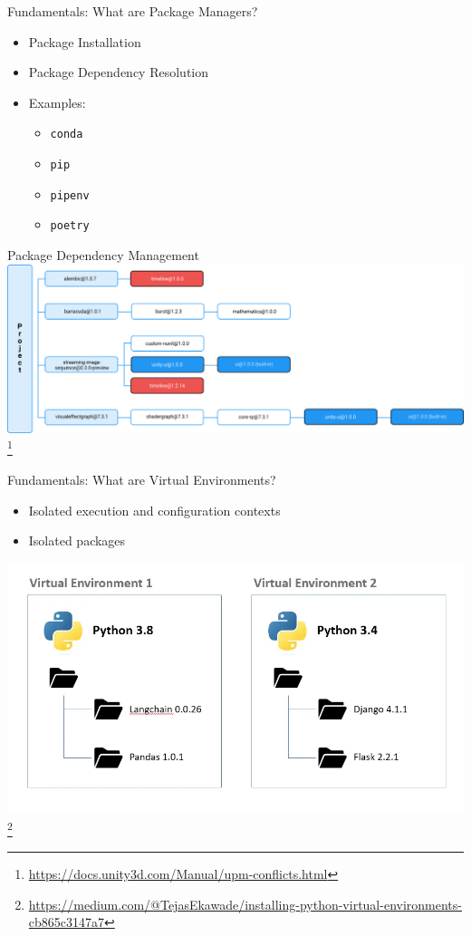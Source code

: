 \documentclass[aspectratio=169]{beamer}
\begin{document}
\begin{frame}{Fundamentals: What are Package Managers?}
    \begin{itemize}
        \item Package Installation
        \item Package Dependency Resolution
        \item Examples:
        \begin{itemize}
            \item \lstinline!conda!
            \item \lstinline!pip!
            \item \lstinline!pipenv!
            \item \lstinline!poetry!
        \end{itemize}
    \end{itemize}
\end{frame}
\begin{frame}{Package Dependency Management}
    \centering
    \includegraphics[width=\textwidth,height=0.8\textheight,keepaspectratio]{dependency_resolution.png} \footnote{\url{https://docs.unity3d.com/Manual/upm-conflicts.html}}
\end{frame}
\begin{frame}{Fundamentals: What are Virtual Environments?}
    \begin{itemize}
        \item Isolated execution and configuration contexts
        \item Isolated packages
    \end{itemize}
    \centering
    \includegraphics[width=\textwidth,height=0.55\textheight,keepaspectratio]{python_venv.png} \footnote{\url{https://medium.com/@TejasEkawade/installing-python-virtual-environments-cb865c3147a7}}
\end{frame}
\end{document}
